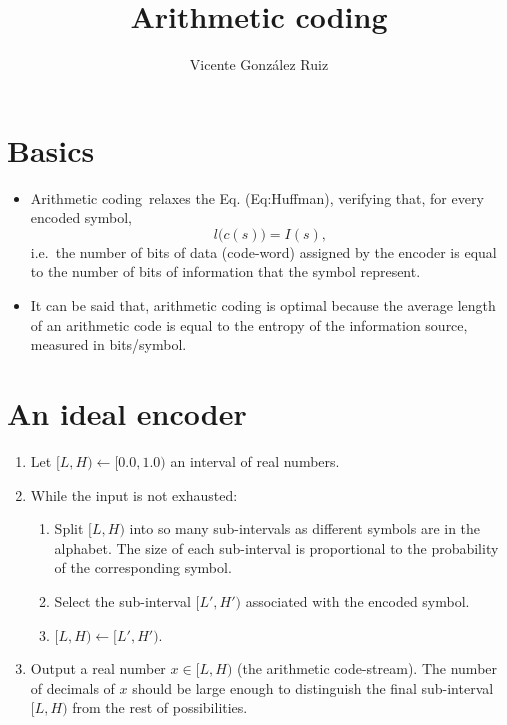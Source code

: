 
\title{Arithmetic coding}

\author{Vicente González Ruiz}

\maketitle

\section{Basics}

\begin{itemize}
\tightlist
\item
  Arithmetic coding~\cite{rissanen1979arithmetic, witten1987arithmetic}relaxes the Eq. (Eq:Huffman), verifying that, for
  every encoded symbol, \begin{equation}
    l\big(c(s)\big) = I(s), \tag{Eq:arithmetic}
  \end{equation} i.e.~the number of bits of data (code-word) assigned by
  the encoder is equal to the number of bits of information that the
  symbol represent.
\end{itemize}


\begin{itemize}
\tightlist
\item
  It can be said that, arithmetic coding is optimal because the average
  length of an arithmetic code is equal to the entropy of the
  information source, measured in bits/symbol.
\end{itemize}

\section{An ideal encoder}
\begin{enumerate}
\def\labelenumi{\arabic{enumi}.}
\tightlist
\item
  Let \([L,H)\leftarrow [0.0,1.0)\) an interval of real numbers.
\item
  While the input is not exhausted:
  \begin{enumerate}
  \def\labelenumii{\arabic{enumii}.}
  \tightlist
  \item
    Split \([L,H)\) into so many sub-intervals as different symbols are
    in the alphabet. The size of each sub-interval is proportional to
    the probability of the corresponding symbol.
  \item
    Select the sub-interval \([L',H')\) associated with the encoded
    symbol.
  \item
    \([L,H)\leftarrow [L',H')\).
  \end{enumerate}
\item
  Output a real number \(x\in[L,H)\) (the arithmetic code-stream). The
  number of decimals of \(x\) should be large enough to distinguish the
  final sub-interval \([L,H)\) from the rest of possibilities.
\end{enumerate}


